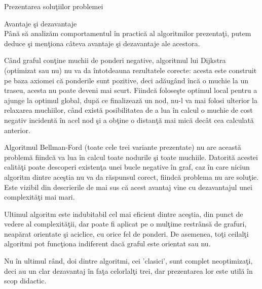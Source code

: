 \documentclass[a4paper]{article}
\begin{document}
\begin{section}{Prezentarea solu\c tiilor problemei\\}
\begin{subsection}{Avantaje \c si dezavantaje\\}
	P\^ an\u a s\u a analiz\u am comportamentul \^ in practic\u a al algoritmilor prezenta\c ti, putem deduce \c si men\c tiona c\^ ateva avantaje \c si dezavantaje ale acestora. \par
	C\^ and graful con\c tine muchii de ponderi negative, algoritmul lui Dijkstra (optimizat sau nu) nu va da \^ intotdeauna rezultatele corecte: acesta este construit pe baza axiomei c\u a ponderile sunt pozitive, deci ad\u aug\^ and \^ inc\u a o muchie la un traseu, acesta nu poate deveni mai scurt. Fiindc\u a folose\c ste optimul local pentru a ajunge la optimul global, dup\u a ce finalizeaz\u a un nod, nu-l va mai folosi ulterior la relaxarea muchiilor, c\^ and exist\u a posibilitatea de a lua \^ in calcul o muchie de cost negativ incident\u a \^ in acel nod \c si a ob\c tine o distan\c t\u a mai mic\u a dec\^ at cea calculat\u a anterior. \par
	Algoritmul Bellman-Ford (toate cele trei variante prezentate) nu are aceast\u a problem\u a fiindc\u a va lua \^ in calcul toate nodurile \c si toate muchiile. Datorit\u a acestei calit\u a\c ti poate descoperi existen\c ta unei bucle negative \^ in graf, caz \^ in care niciun algoritm dintre ace\c stia nu va da r\u aspunsul corect, fiindc\u a problema nu are solu\c tie. Este vizibil din descrierile de mai sus c\u a acest avantaj vine cu dezavantajul unei complexit\u a\c ti mai mari. \par
	Ultimul algoritm este indubitabil cel mai eficient dintre ace\c stia, din punct de vedere al complexit\u a\c tii, dar poate fi aplicat pe o mul\c time restr\^ ans\u a de grafuri, neap\u arat orientate \c si aciclice, cu orice fel de ponderi. De asemenea, to\c ti ceilal\c ti algoritmi pot func\c tiona indiferent dac\u a graful este orientat sau nu. \par
	Nu \^ in ultimul r\^ and, doi dintre algoritmi, cei 'clasici', sunt complet neoptimiza\c ti, deci au un clar dezavantaj \^ in fa\c ta celorlal\c ti trei, dar prezentarea lor este util\u a \^ in scop didactic. \\ \\

\end{subsection}

\end{section}

\end{document}
